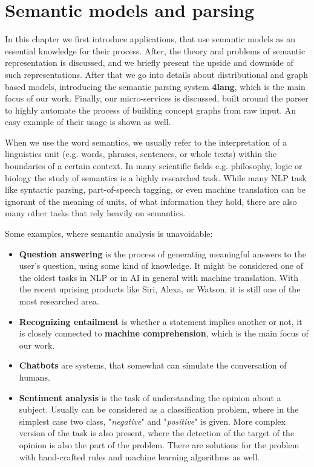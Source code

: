 \chapter{Semantic models and parsing}
\label{chap:semanticparsing}

In this chapter we first introduce applications, that use semantic models as an essential knowledge for their process. After, the theory and problems of semantic representation is discussed, and we briefly present the upside and downside of such representations. After that we go into details about distributional and graph based models, introducing the semantic parsing system \textbf{4lang}, which is the main focus of our work. Finally, our micro-services is discussed, built around the parser to highly automate the process of building concept graphs from raw input. An easy example of their usage is shown as well.

When we use the word semantics, we usually refer to the interpretation of a linguistics unit (e.g. words, phrases, sentences, or whole texts) within the boundaries of a certain context. In many scientific fields e.g. philosophy, logic or biology the study of semantics is a highly researched task. While many NLP task like syntactic parsing, part-of-speech tagging, or even machine translation can be ignorant of the meaning of units, of what information they hold, there are also many other tasks that rely heavily on semantics.

Some examples, where semantic analysis is unavoidable:
\begin{itemize}
	\item \textbf{Question answering} is the process of generating meaningful answers to the user's question, using some kind of knowledge. It might be considered one of the oldest tasks in NLP or in AI in general with machine translation. With the recent uprising products like Siri, Alexa, or Watson, it is still one of the most researched area.
	\item \textbf{Recognizing entailment} is whether a statement implies another or not, it is closely connected to \textbf{machine comprehension}, which is the main focus of our work.
	\item \textbf{Chatbots} are systems, that somewhat can simulate the conversation of humans.
	\item \textbf{Sentiment analysis} is the task of understanding the opinion about a subject. Usually can be considered as a classification problem, where in the simplest case two class, "\textit{negative}" and "\textit{positive}" is given. More complex version of the task is also present, where the detection of the target of the opinion is also the part of the problem. There are solutions for the problem with hand-crafted rules and machine learning algorithms as well.  
\end{itemize}

